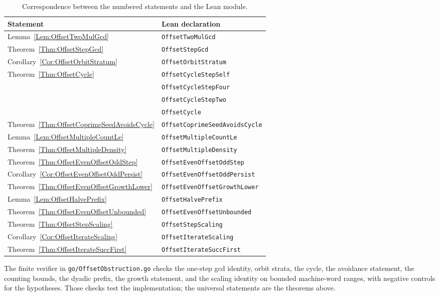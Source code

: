 \documentclass[11pt,letterpaper]{article}
\begin{document}
\begin{table}[htbp]
\centering
\begin{tabular}{ll}
\toprule
Statement & Lean declaration \\
\midrule
Lemma~\ref{Lem:OffsetTwoMulGcd} & \texttt{OffsetTwoMulGcd} \\
Theorem~\ref{Thm:OffsetStepGcd} & \texttt{OffsetStepGcd} \\
Corollary~\ref{Cor:OffsetOrbitStratum} & \texttt{OffsetOrbitStratum} \\
Theorem~\ref{Thm:OffsetCycle} & \texttt{OffsetCycleStepSelf} \\
 & \texttt{OffsetCycleStepFour} \\
 & \texttt{OffsetCycleStepTwo} \\
 & \texttt{OffsetCycle} \\
Theorem~\ref{Thm:OffsetCoprimeSeedAvoidsCycle} & \texttt{OffsetCoprimeSeedAvoidsCycle} \\
Lemma~\ref{Lem:OffsetMultipleCountLe} & \texttt{OffsetMultipleCountLe} \\
Theorem~\ref{Thm:OffsetMultipleDensity} & \texttt{OffsetMultipleDensity} \\
Theorem~\ref{Thm:OffsetEvenOffsetOddStep} & \texttt{OffsetEvenOffsetOddStep} \\
Corollary~\ref{Cor:OffsetEvenOffsetOddPersist} & \texttt{OffsetEvenOffsetOddPersist} \\
Theorem~\ref{Thm:OffsetEvenOffsetGrowthLower} & \texttt{OffsetEvenOffsetGrowthLower} \\
Lemma~\ref{Lem:OffsetHalvePrefix} & \texttt{OffsetHalvePrefix} \\
Theorem~\ref{Thm:OffsetEvenOffsetUnbounded} & \texttt{OffsetEvenOffsetUnbounded} \\
Theorem~\ref{Thm:OffsetStepScaling} & \texttt{OffsetStepScaling} \\
Corollary~\ref{Cor:OffsetIterateScaling} & \texttt{OffsetIterateScaling} \\
Theorem~\ref{Thm:OffsetIterateSuccFirst} & \texttt{OffsetIterateSuccFirst} \\
\bottomrule
\end{tabular}
\caption{Correspondence between the numbered statements and the Lean module.}
\label{Table:OffsetObstructionLean}
\end{table}

The finite verifier in \texttt{go/OffsetObstruction.go} checks the one-step
gcd identity, orbit strata, the cycle, the avoidance statement, the counting
bounds, the dyadic prefix, the growth statement, and the scaling identity on
bounded machine-word ranges, with negative controls for the hypotheses. Those
checks test the implementation; the universal statements are the theorems
above.
\end{document}
